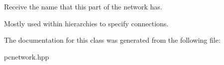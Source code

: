 Receive the name that this part of the network has. 

Mostly used within hierarchies to specify connections. 

The documentation for this class was generated from the following file\-:\begin{DoxyCompactItemize}
\item 
pcnetwork.\-hpp\end{DoxyCompactItemize}
